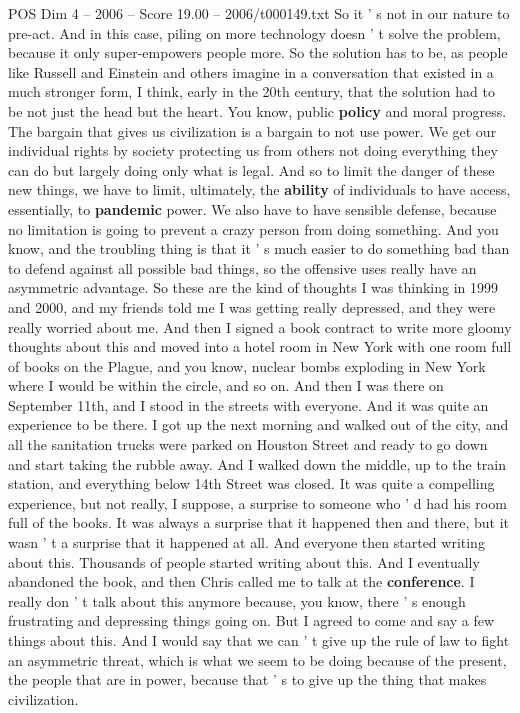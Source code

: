 \begin{textsample}{POS Dim 4 – 2006 – Score 19.00 – 2006/t000149.txt}
So it ' s not in our nature to pre-act.
And in this case, piling on more technology doesn ' t solve the problem, because it only super-empowers people more.
So the solution has to be, as people like Russell and Einstein and others imagine in a conversation that existed in a much stronger form, I think, early in the 20th century, that the solution had to be not just the head but the heart.
You know, public \textbf{policy} and moral progress.
The bargain that gives us civilization is a bargain to not use power.
We get our individual rights by society protecting us from others not doing everything they can do but largely doing only what is legal.
And so to limit the danger of these new things, we have to limit, ultimately, the \textbf{ability} of individuals to have access, essentially, to \textbf{pandemic} power.
We also have to have sensible defense, because no limitation is going to prevent a crazy person from doing something.
And you know, and the troubling thing is that it ' s much easier to do something bad than to defend against all possible bad things, so the offensive uses really have an asymmetric advantage.
So these are the kind of thoughts I was thinking in 1999 and 2000, and my friends told me I was getting really depressed, and they were really worried about me.
And then I signed a book contract to write more gloomy thoughts about this and moved into a hotel room in New York with one room full of books on the Plague, and you know, nuclear bombs exploding in New York where I would be within the circle, and so on.
And then I was there on September 11th, and I stood in the streets with everyone.
And it was quite an experience to be there.
I got up the next morning and walked out of the city, and all the sanitation trucks were parked on Houston Street and ready to go down and start taking the rubble away.
And I walked down the middle, up to the train station, and everything below 14th Street was closed.
It was quite a compelling experience, but not really, I suppose, a surprise to someone who ' d had his room full of the books.
It was always a surprise that it happened then and there, but it wasn ' t a surprise that it happened at all.
And everyone then started writing about this.
Thousands of people started writing about this.
And I eventually abandoned the book, and then Chris called me to talk at the \textbf{conference}.
I really don ' t talk about this anymore because, you know, there ' s enough frustrating and depressing things going on.
But I agreed to come and say a few things about this.
And I would say that we can ' t give up the rule of law to fight an asymmetric threat, which is what we seem to be doing because of the present, the people that are in power, because that ' s to give up the thing that makes civilization.

\end{textsample}
